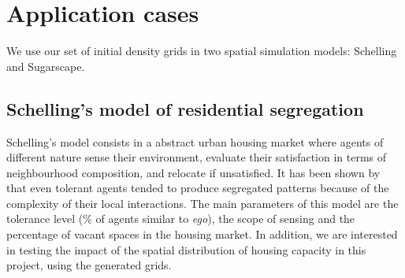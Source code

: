 \documentclass[Afour,sageh,times]{sagej}
\begin{document}
\section{Application cases}

We use our set of initial density grids in two spatial simulation models: Schelling and Sugarscape.


\subsection{Schelling's model of residential segregation}

Schelling's model consists in a abstract urban housing market where agents of different nature sense their environment, evaluate their satisfaction in terms of neighbourhood composition, and relocate if unsatisfied. It has been shown by \cite{Schelling1969} that even tolerant agents tended to produce segregated patterns because of the complexity of their local interactions. The main parameters of this model are the tolerance level (\% of agents similar to {\it ego}), the scope of sensing and the percentage of vacant spaces in the housing market. In addition, we are interested in testing the impact of the spatial distribution of housing capacity in this project, using the generated grids. 
\end{document}
